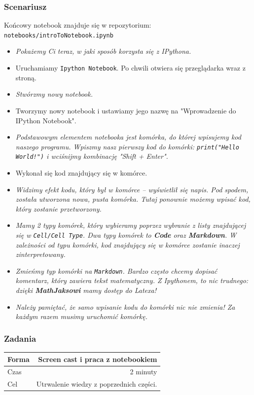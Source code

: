 \documentclass{mwart}
\begin{document}
\subsubsection{Scenariusz}
Końcowy notebook znajduje się w repozytorium: \texttt{notebooks/introToNotebook.ipynb}
\begin{itemize}
  \item \emph{Pokażemy Ci teraz, w jaki sposób korzysta się z IPythona.}
  \item Uruchamiamy \texttt{Ipython Notebook}. Po chwili otwiera się przeglądarka wraz z
    stroną.
  \item \emph{Stwórzmy nowy notebook.}
  \item Tworzymy nowy notebook i ustawiamy jego nazwę na "Wprowadzenie do IPython
    Notebook".
  \item \emph{Podstawowym elementem notebooka jest komórka, do której
      wpisujemy kod naszego programu. Wpiszmy nasz pierwszy kod do komórki:
    \texttt{print("Hello World!")} i wciśnijmy kombinację "Shift + Enter".}
  \item Wykonał się kod znajdujący się w komórce.
  \item \emph{Widzimy efekt kodu, który był w komórce -- wyświetlił się napis. Pod spodem, została utworzona nowa,
      pusta komórka. Tutaj ponownie możemy wpisać kod, który zostanie przetworzony.}
  \item \emph{Mamy 2 typy komórek, który wybieramy poprzez wybranie z listy znajdującej się w
      \texttt{Cell/Cell Type}. Dwa typy komórek to \textbf{Code} oraz \textbf{Markdown}. W
    zależności od typu komórki, kod znajdujący się w komórce zostanie inaczej
    zinterpretowany.}
\item \emph{Zmieńmy typ komórki na \texttt{Markdown}. Bardzo często chcemy dopisać
    komentarz, który zawiera tekst matematyczny. Z Ipythonem, to nic trudnego: dzięki
    \textbf{MathJaksowi} mamy dostęp do Latexa!}
\item \emph{Należy pamiętać, że samo wpisanie kodu do komórki nic nie zmienia! Za każdym
    razem musimy uruchomić komórkę.}

\end{itemize}

\subsubsection{Zadania}
\begin{center}
  \begin{tabular}{lr}
    \toprule
    Forma & Screen cast i praca z notebookiem \\
    \midrule
    Czas & 2 minuty \\
    Cel & Utrwalenie wiedzy z poprzednich części. \\
    \bottomrule
  \end{tabular}
\end{center}
\end{document}
